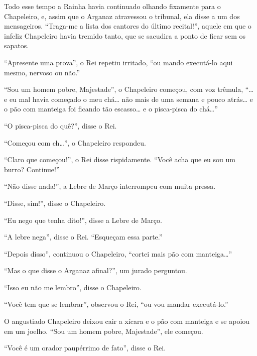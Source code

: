 Todo esse tempo a Rainha havia continuado olhando fixamente para o
Chapeleiro, e, assim que o Arganaz atravessou o tribunal, ela disse a um
dos mensageiros. ``Traga-me a lista dos cantores do último recital!'',
aquele em que o infeliz Chapeleiro havia tremido tanto, que se sacudira
a ponto de ficar sem os sapatos.

``Apresente uma prova'', o Rei repetiu irritado, ``ou mando executá-lo
aqui mesmo, nervoso ou não.''

``Sou um homem pobre, Majestade'', o Chapeleiro começou, com voz
trêmula, ``\ldots{} e eu mal havia começado o meu chá\ldots{} não mais de uma
semana e pouco atrás\ldots{} e o pão com manteiga foi ficando tão escasso\ldots{} e
o pisca-pisca do chá\ldots{}''

``O pisca-pisca do quê?'', disse o Rei.

``Começou com ch\ldots{}'', o Chapeleiro respondeu.

``Claro que começou!'', o Rei disse rispidamente. ``Você acha que eu sou
um burro? Continue!''


``Não disse nada!'', a Lebre de Março interrompeu com muita pressa.

``Disse, sim!'', disse o Chapeleiro.

``Eu nego que tenha dito!'', disse a Lebre de Março.

``A lebre nega'', disse o Rei. ``Esqueçam essa parte.''


``Depois disso'', continuou o Chapeleiro, ``cortei mais pão com
manteiga\ldots{}''

``Mas o que disse o Arganaz afinal?'', um jurado perguntou.

``Isso eu não me lembro'', disse o Chapeleiro.

``Você tem que se lembrar'', observou o Rei, ``ou vou mandar
executá-lo.''

O angustiado Chapeleiro deixou cair a xícara e o pão com manteiga e se
apoiou em um joelho. ``Sou um homem pobre, Majestade'', ele começou.

``Você é um orador paupérrimo de fato'', disse o Rei.

